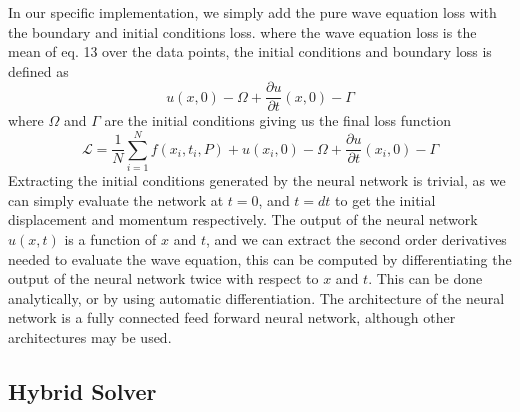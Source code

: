 \documentclass[twoside,11pt]{report}
\begin{document}
    In our specific implementation, we simply add the pure wave equation loss with the boundary and initial conditions loss.
    where the wave equation loss is the mean of eq. 13 over the data points, the initial conditions and boundary loss
    is defined as
    \begin{equation}
        u(x, 0) - \Omega  + \frac{\partial u}{\partial t}(x, 0) - \Gamma
    \end{equation}
    where $\Omega$ and $\Gamma$ are the initial conditions
    giving us the final loss function
    \begin{equation}
        \mathcal{L} = \frac{1}{N}\sum_{i=1}^{N} f(x_i, t_i, P) + u(x_i, 0) - \Omega  + 
        \frac{\partial u}{\partial t}(x_i, 0) - \Gamma
    \end{equation}
    Extracting the initial conditions generated by the neural network is trivial, as we can simply evaluate the network
    at $t=0$, and $t=dt$ to get the initial displacement and momentum respectively. The output of the neural network
    $u(x,t)$ is a function of $x$ and $t$, and we can extract the second order derivatives
    needed to evaluate the wave equation, this can be computed by differentiating the output of the neural network twice
    with respect to $x$ and $t$. This can be done analytically, or by using automatic differentiation.
    The architecture of the neural network is a fully connected feed forward neural network, although other architectures
    may be used.
    \\
    \cite{fys-stk}
    \cite{krishnapriyan2021characterizing}



\subsection{Hybrid Solver}
\label{sec:hybrid}
     
\end{document}
